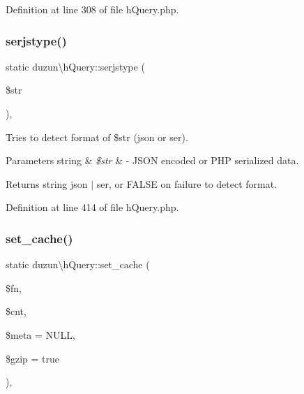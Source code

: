 Definition at line 308 of file h\+Query.\+php.

\mbox{\label{classduzun_1_1hQuery_ac01b0ddd586fe833f61c733147231a47}} 
\subsubsection{\texorpdfstring{serjstype()}{serjstype()}}
{\footnotesize\ttfamily static duzun\textbackslash{}h\+Query\+::serjstype (\begin{DoxyParamCaption}\item[{}]{\$str }\end{DoxyParamCaption})\hspace{0.3cm}{\ttfamily [static]}, {\ttfamily [protected]}}

Tries to detect format of \$str (json or ser).


\begin{DoxyParams}[1]{Parameters}
string & {\em \$str} & -\/ J\+S\+ON encoded or P\+HP serialized data.\\
\hline
\end{DoxyParams}
\begin{DoxyReturn}{Returns}
string \textquotesingle{}json\textquotesingle{} $\vert$ \textquotesingle{}ser\textquotesingle{}, or F\+A\+L\+SE on failure to detect format. 
\end{DoxyReturn}


Definition at line 414 of file h\+Query.\+php.

\mbox{\label{classduzun_1_1hQuery_a9e61ec098daddf504ffc239ff7d7910f}} 
\subsubsection{\texorpdfstring{set\+\_\+cache()}{set\_cache()}}
{\footnotesize\ttfamily static duzun\textbackslash{}h\+Query\+::set\+\_\+cache (\begin{DoxyParamCaption}\item[{}]{\$fn,  }\item[{}]{\$cnt,  }\item[{}]{\$meta = {\ttfamily NULL},  }\item[{}]{\$gzip = {\ttfamily true} }\end{DoxyParamCaption})\hspace{0.3cm}{\ttfamily [static]}, {\ttfamily [protected]}}

